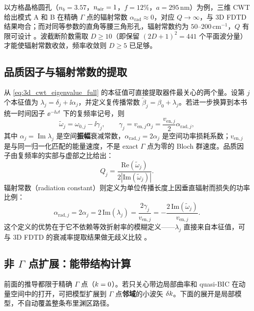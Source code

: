 以方格晶格圆孔（$n_b=3.57$，$n_{\rm air}=1$，$f=12\%$，$a=295\,\mathrm{nm}$）为例，三维 CWT 给出模式 A 和 B 在精确 $\Gamma$ 点的辐射常数 $\alpha_{\mathrm{rad}}\approx0$，对应 $Q\to\infty$，与 3D FDTD 结果吻合；而对同等参数的直角等腰三角形孔，辐射常数约为 $50$--$200\,\mathrm{cm}^{-1}$，$Q$ 有限可设计 \cite{liang2012square}。波截断阶数需取 $D\geq10$（即保留 $(2D+1)^2=441$ 个平面波分量）才能使辐射常数收敛，频率收敛则 $D\geq5$ 已足够。

\subsection{品质因子与辐射常数的提取}

从 \cref{eq:3d_cwt_eigenvalue_full} 的本征值可直接提取器件最关心的两个量。设第 $j$ 个本征值为 $\lambda_j=\delta_j+\ii\alpha_j$，并定义复传播常数 $\tilde\beta_j=\beta_0+\lambda_j$。若进一步换算到本书统一时间因子 $\ee^{-\ii\omega t}$ 下的复频率记号，则
\begin{equation}
\tilde{\omega}_j=\omega_{0,j}-\ii\gamma_j,
\qquad
\gamma_j=v_{\mathrm{en},j}\alpha_j
=\frac{v_{\mathrm{en},j}}{2}\alpha_{\mathrm{rad},j},
\label{eq:3d_cwt_complex_freq}
\end{equation}
其中 $\alpha_j=\operatorname{Im}\lambda_j$ 是空间\textbf{振幅}衰减常数，$\alpha_{\mathrm{rad},j}=2\alpha_j$ 是空间功率损耗系数；$v_{\mathrm{en},j}$ 是与同一归一化匹配的能量速度，不是 exact $\Gamma$ 点为零的 Bloch 群速度。品质因子由复频率的实部与虚部之比给出：
\begin{equation}
Q_j = \frac{\mathrm{Re}(\tilde{\omega}_j)}{2|\mathrm{Im}(\tilde{\omega}_j)|}.
\label{eq:3d_cwt_Q}
\end{equation}
辐射常数（radiation constant）则定义为单位传播长度上因垂直辐射而损失的功率比例：
\begin{equation}
\alpha_{\mathrm{rad},j}
=2\alpha_j
=2\,\mathrm{Im}(\lambda_j)
=\frac{2\gamma_j}{v_{\mathrm{en},j}}
=-\frac{2\,\mathrm{Im}(\tilde{\omega}_j)}{v_{\mathrm{en},j}}.
\label{eq:3d_cwt_alpha_rad}
\end{equation}
这个定义的优势在于它不依赖等效折射率的模糊定义——$\lambda_j$ 直接来自本征值，可与 3D FDTD 的衰减率提取结果做无歧义比较 \cite{liang2012square}。

\subsection{非 \texorpdfstring{$\Gamma$}{Gamma} 点扩展：能带结构计算}
\label{sec:3d-cwt-non-gamma}

前面的推导都限于精确 $\Gamma$ 点（$k=0$）。若只关心带边局部曲率和 quasi-BIC 在动量空间中的打开，可把模型扩展到 $\Gamma$ 点\textbf{邻域}的小波矢 $\delta k$。下面的展开是局部模型，不自动覆盖整条布里渊区路径。


